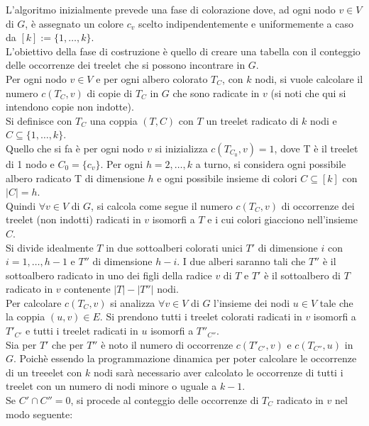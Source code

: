 L'algoritmo inizialmente prevede una fase di colorazione dove, ad ogni nodo $ v \in V $ di $ G $, \`e assegnato un colore $ c_v $ scelto indipendentemente e uniformemente a caso da $ [k] := \{1, \dots ,k\} $.\\
L'obiettivo della fase di costruzione \`e quello di creare una tabella con il conteggio delle occorrenze dei treelet che si possono incontrare in $ G $.\\
Per ogni nodo $ v \in V $ e per ogni albero colorato $ T_C $, con $ k $ nodi, si vuole calcolare il numero $ c(T_C , v) $ di copie di $ T_C $  in $ G $ che sono radicate in $ v $ (si noti che qui si intendono copie non indotte).\\
Si definisce con $ T_C $ una coppia $ (T,C) $ con $ T $ un treelet radicato di $ k $ nodi e $ C \subseteq {\{1,\dots,k\}} $.\\
Quello che si fa \`e per ogni nodo $ v $ si inizializza $ c(T_{C_0} , v) = 1 $, dove T \`e il treelet di 1 nodo e $ C_0 = \{c_v\} $.
Per ogni $ h = 2,\dots,k $ a turno, si considera ogni possibile albero radicato T di dimensione $ h $ e ogni possibile insieme di colori $ C \subseteq [k] $ con $ |C| = h $.\\
Quindi $ \forall v \in V$ di $ G $, si calcola come segue il numero $ c(T_C,v) $ di occorrenze dei treelet (non indotti) radicati in $ v $ isomorfi a $ T $ e i cui colori giacciono nell'insieme $ C $.
\\ Si divide idealmente $ T $ in due sottoalberi colorati unici $ T' $ di dimensione $ i $ con $ i = 1, \dots,h-1 $ e $ T'' $ di dimensione $ h-i $.
I due alberi saranno tali che  $ T'' $ \`e il sottoalbero radicato in uno dei figli della radice $ v $ di $ T $ e $ T' $ \`e il sottoalbero di $ T $ radicato in $ v $ contenente $ |T| - |T''| $ nodi.\\
Per calcolare $ c(T_C,v) $ si analizza $ \forall v \in V $ di $ G $ l'insieme dei nodi $ u \in V $ tale che la coppia $ (u,v)\in E $.
Si prendono  tutti i treelet colorati radicati in $ v $ isomorfi a $ T'_{C'} $ e tutti i  treelet radicati in $ u $ isomorfi a $ T''_{C''} $.\\
Sia per $ T' $ che per $ T'' $ \`e noto il numero di occorrenze $ c(T'_{C'},v) $ e $ c(T_{C''},u) $ in $ G $. Poich\`e essendo la programmazione dinamica per poter calcolare le occorrenze di un treeelet con $ k $ nodi sar\`a necessario aver calcolato le occorrenze di tutti i treelet con un numero di nodi minore o uguale a $ k-1 $.\\
Se $ C' \cap C'' = 0 $, si procede al conteggio delle occorrenze di $ T_C $ radicato in $ v $ nel modo seguente:

